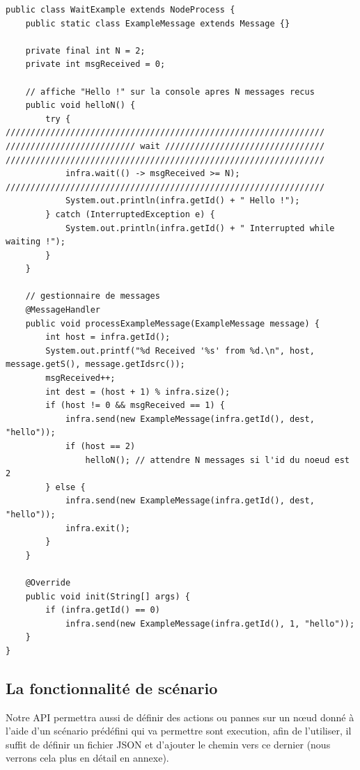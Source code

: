 \documentclass{article}
\begin{document}
					\begin{lstlisting}
public class WaitExample extends NodeProcess {
	public static class ExampleMessage extends Message {}

	private final int N = 2;
	private int msgReceived = 0;

	// affiche "Hello !" sur la console apres N messages recus
	public void helloN() {
		try {
////////////////////////////////////////////////////////////////
////////////////////////// wait ////////////////////////////////
////////////////////////////////////////////////////////////////
			infra.wait(() -> msgReceived >= N);
////////////////////////////////////////////////////////////////
			System.out.println(infra.getId() + " Hello !");
		} catch (InterruptedException e) {
			System.out.println(infra.getId() + " Interrupted while waiting !");
		}
	}

	// gestionnaire de messages
	@MessageHandler
	public void processExampleMessage(ExampleMessage message) {
		int host = infra.getId();
		System.out.printf("%d Received '%s' from %d.\n", host, message.getS(), message.getIdsrc());
		msgReceived++;
		int dest = (host + 1) % infra.size();
		if (host != 0 && msgReceived == 1) {
			infra.send(new ExampleMessage(infra.getId(), dest, "hello"));
			if (host == 2)
				helloN(); // attendre N messages si l'id du noeud est 2
		} else {
			infra.send(new ExampleMessage(infra.getId(), dest, "hello"));
			infra.exit();
		}
	}

	@Override
	public void init(String[] args) {
		if (infra.getId() == 0)
			infra.send(new ExampleMessage(infra.getId(), 1, "hello"));
	}
}
					\end{lstlisting}
					\newpage
					\subsection{La fonctionnalité de scénario}
Notre API permettra aussi de définir des actions ou pannes sur un nœud donné à l'aide d'un scénario prédéfini qui va permettre sont execution,
afin de l'utiliser, il suffit de définir un fichier JSON et d'ajouter le chemin vers ce dernier (nous verrons cela plus en détail en annexe).
\end{document}
